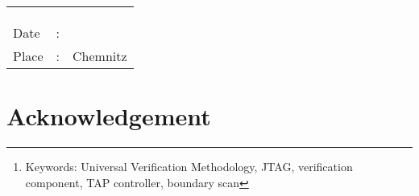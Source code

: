 \documentclass[a4paper,11pt]{article}
\begin{document}
\vfill
\begin{minipage}[t]{0.3\textwidth}%
\begin{tabular}{lcc}
 &  & \tabularnewline
 &  & \tabularnewline
 &  & \tabularnewline
Date & : & \tabularnewline
Place &: & Chemnitz\tabularnewline
\end{tabular}%

\end{minipage}

\pagebreak
\section*{\LARGE{Acknowledgement}}

%
%

\newpage

\begin{abstract}

%
\footnote{Keywords: Universal Verification Methodology, JTAG, verification component, TAP controller, boundary scan}
\end{abstract}

\newpage
\tableofcontents

\newpage
\end{document}
